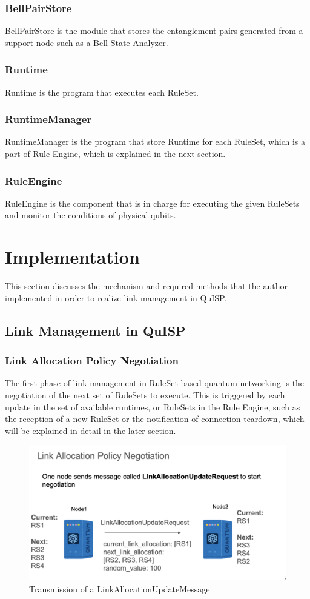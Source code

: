 \subsubsection{BellPairStore}
BellPairStore is the module that stores the entanglement pairs generated from a support node such as a Bell State Analyzer.

\subsubsection{Runtime}
Runtime is the program that executes each RuleSet.

\subsubsection{RuntimeManager}
RuntimeManager is the program that store Runtime for each RuleSet, which is a part of Rule Engine, which is explained in the next section.

\subsubsection{RuleEngine}
RuleEngine is the component that is in charge for executing the given RuleSets and monitor the conditions of physical qubits.


\section{Implementation}

This section discusses the mechanism and required methods that the author implemented in order to realize link management in QuISP.

\subsection{Link Management in QuISP}

\subsubsection{Link Allocation Policy Negotiation}
The first phase of link management in RuleSet-based quantum networking is the negotiation of the next set of RuleSets to execute.
This is triggered by each update in the set of available runtimes, or RuleSets in the Rule Engine, such as the reception of a new RuleSet or the notification of connection teardown, which will be explained in detail in the later section.
\begin{figure}[H]
  \centerline{\includegraphics[width=.5\columnwidth]{images/link_allocation_update_message.png}}
  \caption{Transmission of a LinkAllocationUpdateMessage}
\end{figure}

